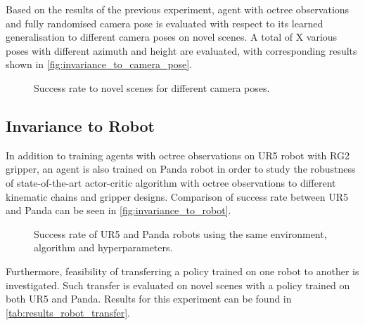 Based on the results of the previous experiment, agent with octree observations and fully randomised camera pose is evaluated with respect to its learned generalisation to different camera poses on novel scenes. A total of X various poses with different azimuth and height are evaluated, with corresponding results shown in \autoref{fig:invariance_to_camera_pose}.

\begin{figure}[ht]
    \centering
    \caption{Success rate to novel scenes for different camera poses.}
    \label{fig:invariance_to_camera_pose}
\end{figure}


\subsection{Invariance to Robot}

In addition to training agents with octree observations on UR5 robot with RG2 gripper, an agent is also trained on Panda robot in order to study the robustness of state-of-the-art actor-critic algorithm with octree observations to different kinematic chains and gripper designs. Comparison of success rate between UR5 and Panda can be seen in \autoref{fig:invariance_to_robot}.

\begin{figure}[ht]
    \centering
    \caption{Success rate of UR5 and Panda robots using the same environment, algorithm and hyperparameters.}
    \label{fig:invariance_to_robot}
\end{figure}

Furthermore, feasibility of transferring a policy trained on one robot to another is investigated. Such transfer is evaluated on novel scenes with a policy trained on both UR5 and Panda. Results for this experiment can be found in \autoref{tab:results_robot_transfer}.


